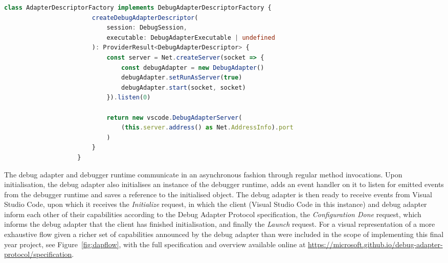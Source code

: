\documentclass[12pt,pdftex,titlepage]{report}
\begin{document}
            \medskip
            \begin{spacing}{1.0}
                \begin{lstlisting}[label={lst:descriptor}, gobble=20, language=TypeScript, caption={The class used to initialise the Debug Adapter and return the Debug Adapter Descriptor to Visual Studio Code.}]
                    class AdapterDescriptorFactory implements DebugAdapterDescriptorFactory {
                        createDebugAdapterDescriptor(
                            session: DebugSession,
                            executable: DebugAdapterExecutable | undefined
                        ): ProviderResult<DebugAdapterDescriptor> {
                            const server = Net.createServer(socket => {
                                const debugAdapter = new DebugAdapter()
                                debugAdapter.setRunAsServer(true)
                                debugAdapter.start(socket, socket)
                            }).listen(0)

                            return new vscode.DebugAdapterServer(
                                (this.server.address() as Net.AddressInfo).port
                            )
                        }
                    }
                \end{lstlisting}
            \end{spacing}
            \bigskip

            The debug adapter and debugger runtime communicate in an asynchronous fashion through regular method invocations. Upon initialisation, the debug adapter also initialises an instance of the debugger runtime, adds an event handler 
            on it to listen for emitted events from the debugger runtime and saves a reference to the initialised object. The debug adapter is then ready to receive events from Visual Studio Code, upon which it receives the \textit{Initialize}
            request, in which the client (Visual Studio Code in this instance) and debug adapter inform each other of their capabilities according to the Debug Adapter Protocol specification, the \textit{Configuration Done} request, which informs 
            the debug adapter that the client has finished initialisation, and finally the \textit{Launch} request. For a visual representation of a more exhaustive flow given a richer set of capabilities announced by the debug adapter than were
            included in the scope of implementing this final year project, see Figure~\ref{fig:dapflow}, with the full specification and overview available online at \url{https://microsoft.github.io/debug-adapter-protocol/specification}.
            
\end{document}

